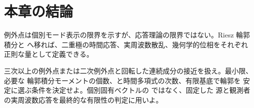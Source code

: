 \section{本章の結論}

例外点は個別モード表示の限界を示すが、応答理論の限界ではない。Riesz 輪郭積分と
へ移れば、二重極の時間応答、実周波数散乱、幾何学的位相をそれぞれ
正則な量として定義できる。

\begin{researchproblem}[高次例外点と連続成分]
三次以上の例外点または二次例外点と回転した連続成分の接近を扱え。最小限、必要な
輪郭積分モーメントの個数、と時間多項式の次数、有限基底で輪郭を
安定に選ぶ条件を決定せよ。個別固有ベクトルの  ではなく、固定した
源と観測者の実周波数応答を最終的な有限性の判定に用いよ。
\end{researchproblem}
